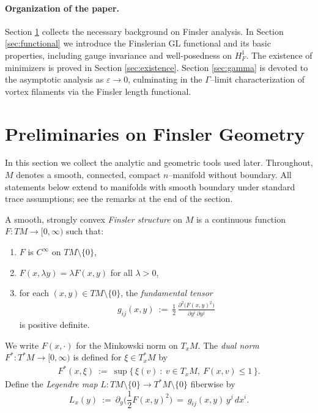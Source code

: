 \documentclass[fleqn,11pt,twoside]{article}
\theoremstyle{definition}
\begin{document}
\paragraph{Organization of the paper.}
Section \ref{sec:prelim} collects the necessary background on Finsler analysis. In Section \ref{sec:functional} we introduce the Finslerian GL functional and its basic properties, including gauge invariance and well-posedness on $H^1_F$. The existence of
minimizers is proved in Section \ref{sec:existence}. Section \ref{sec:gamma} is devoted to the asymptotic analysis as $\varepsilon\to 0$, culminating in the $\Gamma$--limit
characterization of vortex filaments via the Finsler length functional.

\section{Preliminaries on Finsler Geometry}
\label{sec:prelim}

In this section we collect the analytic and geometric tools used later. Throughout, $M$ denotes a smooth, connected, compact $n$--manifold without boundary. All statements below extend to manifolds with smooth boundary under standard trace
assumptions; see the remarks at the end of the section.


A smooth, strongly convex \emph{Finsler structure} on $M$ is a continuous function $F:TM\to[0,\infty)$ such that:
\begin{enumerate}
\item 
$F$ is $C^\infty$ on $TM\setminus\{0\}$,
  
\item 
$F(x,\lambda y)=\lambda F(x,y)$ for all $\lambda>0$,
\item 
for each $(x,y)\in TM\setminus\{0\}$, the \emph{fundamental tensor}
\begin{align*}
g_{ij}(x,y)\ :=\ \frac{1}{2}\,\frac{\partial^2\!\big(F(x,y)^2\big)}{\partial y^i\,\partial y^j}
\end{align*}
is positive definite.
\end{enumerate}
We write $F(x,\cdot)$ for the Minkowski norm on $T_xM$. The \emph{dual norm} $F^*:T^*M\to[0,\infty)$
is defined for $\xi\in T_x^*M$ by
\begin{align*}
F^*(x,\xi)\ :=\ \sup\{\, \xi(v)\ :\ v\in T_xM,\ F(x,v)\le 1\,\}.
\end{align*}
Define the \emph{Legendre map} $L:T M\setminus\{0\}\to T^* M\setminus\{0\}$ fiberwise by
\begin{equation}\label{eq:Legendre}
L_x(y)\ :=\ \partial_y\!\Big(\frac 12 F(x,y)^2\Big)
\ =\ g_{ij}(x,y)\,y^j\,dx^i.
\end{equation}
\end{document}
